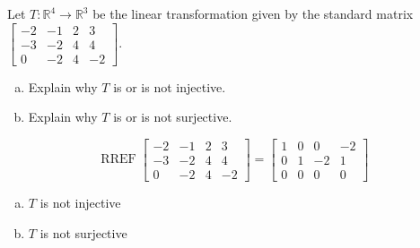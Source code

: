 
\begin{exerciseStatement}
 Let \(T:\mathbb{R}^ 4  \to \mathbb{R}^ 3 \) be the linear transformation given by the standard matrix \( \left[\begin{array}{cccc}
-2 & -1 & 2 & 3 \\
-3 & -2 & 4 & 4 \\
0 & -2 & 4 & -2
\end{array}\right] .\)
\begin{enumerate}[(a)]
\item Explain why \(T\) is or is not injective.
\item Explain why \(T\) is or is not surjective.
\end{enumerate}
    
\end{exerciseStatement}
    
\begin{exerciseAnswer} 


\[\operatorname{RREF} \left[\begin{array}{cccc}
-2 & -1 & 2 & 3 \\
-3 & -2 & 4 & 4 \\
0 & -2 & 4 & -2
\end{array}\right] = \left[\begin{array}{cccc}
1 & 0 & 0 & -2 \\
0 & 1 & -2 & 1 \\
0 & 0 & 0 & 0
\end{array}\right] \]


\begin{enumerate}[(a)]
\item \(T\) is not injective
\item \(T\) is not surjective
\end{enumerate}
    
\end{exerciseAnswer}
    
